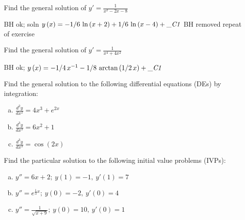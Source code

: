 \documentclass[12pt]{book}
\begin{document}

\begin{exercise}
Find the general solution of $y' = \frac{1}{x^2-2x-8}$
\end{exercise}
{\color{teal}BH ok; soln $y \left( x \right) =-1/6\,\ln  \left( x+2 \right) +1/6\,\ln  \left( x-
4 \right) +{\it \_C1}$
}
{\color{teal}BH removed repeat of exercise}

\begin{exercise}
Find the general solution of $y' = \frac{1}{x^4 + 4x^2}$
\end{exercise}
{\color{teal}BH ok; 
$y \left( x \right) =-1/4\,{x}^{-1}-1/8\,\arctan \left( 1/2\,x \right) 
+{\it \_C1}$}

\begin{exercise}
Find the general solution to the following differential equations (DEs) by integration:
\begin{enumerate}[a)]
    \item $\frac{d^2y}{dx^2} = 4x^3+ e^{2x}$
    \item $\frac{d^3y}{dx^3} = 6x^2 +1$
    \item $\frac{d^3y}{dx^3}= \cos(2x)$
\end{enumerate}
\end{exercise}


\begin{exercise}
Find the particular solution to the following initial value problems (IVPs):
\begin{enumerate}[a)]
    \item $y'' = 6x + 2 ;\ y(1) = -1,\ y'(1)=7$
    \item $y'' = e^{\frac{1}{3}x} ;\ y(0) = -2,\ y'(0)=4$
    \item $y'' =\frac{1}{\sqrt{x+9}} ;\ y(0) = 10,\ y'(0)=1$
\end{enumerate}
\end{exercise}
\end{document}
